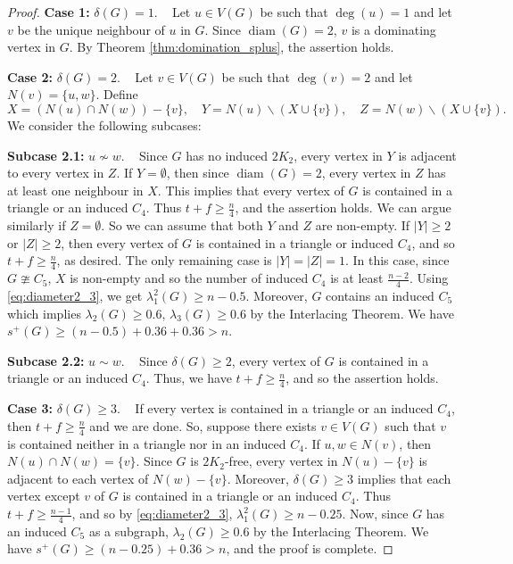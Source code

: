 \documentclass{article}
\DeclareMathOperator{\diam}{diam}
\begin{document}
\begin{proof}
\textbf{Case 1:} $\delta(G)=1$. ~ Let $u\in V(G)$ be such that $\deg(u)=1$ and let $v$ be the unique neighbour of $u$ in $G$. Since $\diam(G)=2$, $v$ is a dominating vertex in $G$. By Theorem \ref{thm:domination_splus}, the assertion holds.

\textbf{Case 2:} $\delta(G)=2$. ~ Let $v\in V(G)$ be such that $\deg(v)=2$ and let $N(v)=\{u, w\}.$ Define 
\[X=(N(u)\cap N(w))-\{v\}, \quad Y= N(u)\backslash (X\cup \{v\}), \quad Z=N(w)\backslash (X\cup \{v\}).\] We consider the following subcases:

\textbf{Subcase 2.1:} $u\nsim w$. ~ Since $G$ has no induced $2K_2$, every vertex in $Y$ is adjacent to every vertex in $Z$. If $Y=\emptyset$, then since $\diam(G)=2$, every vertex in $Z$ has at least one neighbour in $X$. This implies that every vertex of $G$ is contained in a triangle or an induced $C_4$. Thus $t+f\geq \frac{n}{4}$, and the assertion holds. We can argue similarly if $Z=\emptyset$. So we can assume that both $Y$ and $Z$ are non-empty. If $|Y|\geq 2$ or $|Z|\geq 2$, then every 
vertex of $G$ is contained in a triangle or induced $C_4$, and so $t+f\geq \frac{n}{4}$, as desired. The only remaining case is $|Y|=|Z|=1$. In this case, since $G\ncong C_5$, $X$ is non-empty and so  the number of induced $C_4$ is at least $\frac{n-2}{4}$. Using \eqref{eq:diameter2_3}, we get $\lambda_1^2(G)\geq n-0.5$. Moreover, $G$ contains an induced $C_5$ which implies $\lambda_2(G)\geq 0.6$, $\lambda_3(G)\geq 0.6$ by the Interlacing Theorem. We have $s^+(G)\geq (n-0.5)+ 0.36 + 0.36> n.$
 
\textbf{Subcase 2.2:} $u\sim w$. ~ Since $\delta(G)\ge 2$, every vertex of $G$ is contained in a triangle or an induced $C_4$. Thus, we have $t+f\geq \frac{n}{4}$, and so the assertion holds.

\textbf{Case 3:} $\delta(G)\geq 3$. ~ If every vertex is contained in a triangle or an induced $C_4$, then $t+f\ge \frac{n}{4}$ and we are done. So, suppose there exists $v\in V(G)$ such that $v$ is contained neither in a triangle nor in an induced $C_4$. If $u, w\in N(v)$, then $N(u)\cap N(w)=\{v\}$. Since $G$ is $2K_2$-free, every vertex in $N(u)-\{v\}$ is adjacent to each vertex of $N(w)-\{v\}.$ Moreover, $\delta(G)\ge 3$ implies that
 each vertex except $v$ of $G$ is contained in a triangle or an induced $C_4$. Thus
 $t+f\geq \frac{n-1}{4}$, and so by \eqref{eq:diameter2_3}, $\lambda_1^2(G)\ge n-0.25$. Now, since $G$ has an induced $C_5$ as a subgraph, $\lambda_2(G)\geq 0.6$ by the Interlacing Theorem. We have
 $s^+(G)\geq (n-0.25)+ 0.36> n$, and the proof is complete.
\end{proof}
\end{document}
